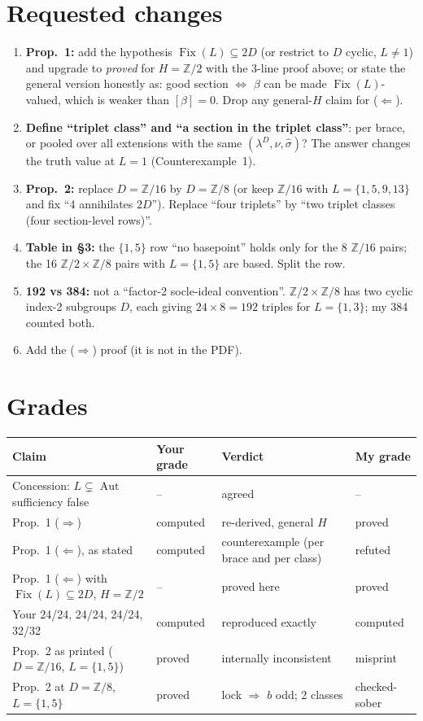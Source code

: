 \documentclass[11pt]{article}
\newcommand{\Z}{\mathbb{Z}}
\newcommand{\Aut}{\operatorname{Aut}}
\newcommand{\Fix}{\operatorname{Fix}}
\newcommand{\sh}{\hat\sigma}
\begin{document}
\section{Requested changes}
\begin{enumerate}[leftmargin=*]
\item \textbf{Prop.~1:} add the hypothesis $\Fix(L)\subseteq2D$ (or restrict to $D$ cyclic,
$L\neq1$) and upgrade to \emph{proved} for $H=\Z/2$ with the 3-line proof above; or state the
general version honestly as: good section $\iff$ $\beta$ can be made $\Fix(L)$-valued, which
is weaker than $[\beta]=0$. Drop any general-$H$ claim for ($\Leftarrow$).
\item \textbf{Define ``triplet class'' and ``a section in the triplet class''}: per brace,
or pooled over all extensions with the same $(\lambda^D,\nu,\sh)$? The answer changes the
truth value at $L=1$ (Counterexample~1).
\item \textbf{Prop.~2:} replace $D=\Z/16$ by $D=\Z/8$ (or keep $\Z/16$ with $L=\{1,5,9,13\}$
and fix ``4 annihilates $2D$''). Replace ``four triplets'' by ``two triplet classes (four
section-level rows)''.
\item \textbf{Table in \S3:} the $\{1,5\}$ row ``no basepoint'' holds only for the 8
$\Z/16$ pairs; the 16 $\Z/2\times\Z/8$ pairs with $L=\{1,5\}$ are based. Split the row.
\item \textbf{192 vs 384:} not a ``factor-2 socle-ideal convention''. $\Z/2\times\Z/8$ has
two cyclic index-2 subgroups $D$, each giving $24\times8=192$ triples for $L=\{1,3\}$;
my 384 counted both.
\item Add the ($\Rightarrow$) proof (it is not in the PDF).
\end{enumerate}

\section*{Grades}
\begin{center}\small
\begin{tabularx}{\textwidth}{@{}YlYl@{}}
\toprule
Claim & Your grade & Verdict & My grade\\
\midrule
Concession: $L\subsetneq\Aut$ sufficiency false & -- & agreed & --\\
Prop.~1 ($\Rightarrow$) & computed & re-derived, general $H$ & proved\\
Prop.~1 ($\Leftarrow$), as stated & computed & counterexample (per brace and per class) & refuted\\
Prop.~1 ($\Leftarrow$) with $\Fix(L)\subseteq2D$, $H=\Z/2$ & -- & proved here & proved\\
Your 24/24, 24/24, 24/24, 32/32 & computed & reproduced exactly & computed\\
Prop.~2 as printed ($D=\Z/16$, $L=\{1,5\}$) & proved & internally inconsistent & misprint\\
Prop.~2 at $D=\Z/8$, $L=\{1,5\}$ & proved & lock $\Rightarrow$ $b$ odd; 2 classes & checked-sober\\
\bottomrule
\end{tabularx}
\end{center}
\end{document}

